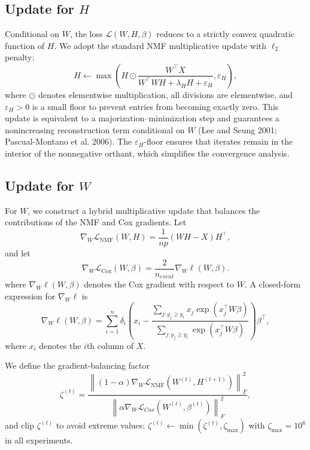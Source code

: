 \documentclass[
]{article}
\begin{document}
\subsection{Update for $H$}

Conditional on \(W\), the loss \(\mathcal{L}(W,H,\beta)\) reduces to a
strictly convex quadratic function of \(H\). We adopt the standard NMF
multiplicative update with \(\ell_2\) penalty: \begin{equation}
\label{eqn:Hupdate}
H \leftarrow
\max\!\left(
  H \odot \frac{W^\top X}{
    W^\top W H + \lambda_H H + \varepsilon_H
  },
  \varepsilon_H
\right),
\end{equation} where \(\odot\) denotes elementwise multiplication, all
divisions are elementwise, and \(\varepsilon_H > 0\) is a small floor to
prevent entries from becoming exactly zero. This update is equivalent to
a majorization--minimization step and guarantees a nonincreasing
reconstruction term conditional on \(W\) (Lee and Seung 2001;
Pascual-Montano et al. 2006). The \(\varepsilon_H\)-floor ensures that
iterates remain in the interior of the nonnegative orthant, which
simplifies the convergence analysis.

\subsection{Update for $W$}

For \(W\), we construct a hybrid multiplicative update that balances the
contributions of the NMF and Cox gradients. Let \[
\nabla_W \mathcal{L}_{\mathrm{NMF}}(W,H)
=
\frac{1}{np}(W H - X)H^\top,
\] and let \[
\nabla_W \mathcal{L}_{\mathrm{Cox}}(W,\beta)
=
\frac{2}{n_{event}}\nabla_W \ell(W,\beta).
\] where \(\nabla_W \ell(W,\beta)\) denotes the Cox gradient with
respect to \(W\). A closed-form expression for \(\nabla_W \ell\) is
\begin{equation}
\nabla_W \ell(W,\beta)
=
\sum_{i=1}^n
\delta_i
\left(
  x_i
  -\frac{
      \sum_{j : y_j \ge y_i}
        x_j \exp(x_j^\top W \beta)
    }{
      \sum_{j : y_j \ge y_i}
        \exp(x_j^\top W \beta)
    }
\right)\beta^\top,
\end{equation} where \(x_i\) denotes the \(i\)th column of \(X\).

We define the gradient-balancing factor \begin{equation}
\label{eq:supp-zeta}
\zeta^{(t)}
=
\frac{
  \left\lVert (1-\alpha) \nabla_W \mathcal{L}_{\mathrm{NMF}}(W^{(t)},H^{(t+1)}) \right\rVert_F^2
}{
  \left\lVert \alpha \nabla_W \mathcal{L}_{Cox}(W^{(t)},\beta^{(t)}) \right\rVert_F^2
},
\end{equation} and clip \(\zeta^{(t)}\) to avoid extreme values:
\(\zeta^{(t)} \leftarrow \min(\zeta^{(t)}, \zeta_{\max})\) with
\(\zeta_{\max} = 10^6\) in all experiments.
\end{document}
